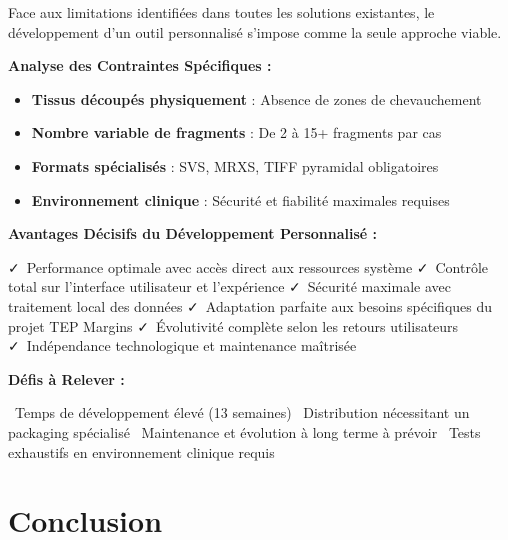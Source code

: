 \documentclass[11pt,a4paper]{article}
\newcommand{\pro}[1]{\textcolor{SuccessGreen}{\faCheck\ #1}}
\newcommand{\con}[1]{\textcolor{DangerRed}{\faTimes\ #1}}
\begin{document}
\begin{tcolorbox}[colback=SuccessGreen!10, colframe=SuccessGreen, title=Développement Personnalisé - Solution Optimale]

Face aux limitations identifiées dans toutes les solutions existantes, le développement d'un outil personnalisé s'impose comme la seule approche viable.

\vspace{0.5cm}

\textbf{Analyse des Contraintes Spécifiques :}
\begin{itemize}[leftmargin=*]
    \item \textbf{Tissus découpés physiquement} : Absence de zones de chevauchement
    \item \textbf{Nombre variable de fragments} : De 2 à 15+ fragments par cas
    \item \textbf{Formats spécialisés} : SVS, MRXS, TIFF pyramidal obligatoires
    \item \textbf{Environnement clinique} : Sécurité et fiabilité maximales requises
\end{itemize}

\vspace{0.5cm}

\textbf{Avantages Décisifs du Développement Personnalisé :}
\begin{itemize}[leftmargin=*]
    \pro{Performance optimale avec accès direct aux ressources système}
    \pro{Contrôle total sur l'interface utilisateur et l'expérience}
    \pro{Sécurité maximale avec traitement local des données}
    \pro{Adaptation parfaite aux besoins spécifiques du projet TEP Margins}
    \pro{Évolutivité complète selon les retours utilisateurs}
    \pro{Indépendance technologique et maintenance maîtrisée}
\end{itemize}

\vspace{0.5cm}

\textbf{Défis à Relever :}
\begin{itemize}[leftmargin=*]
    \con{Temps de développement élevé (13 semaines)}
    \con{Distribution nécessitant un packaging spécialisé}
    \con{Maintenance et évolution à long terme à prévoir}
    \con{Tests exhaustifs en environnement clinique requis}
\end{itemize}

\end{tcolorbox}

\section{Conclusion}
\end{document}
